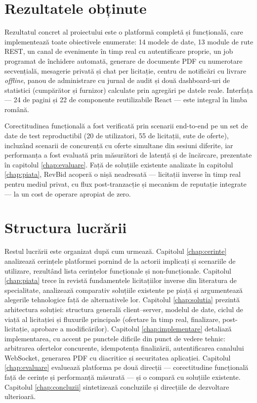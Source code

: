 \section{Rezultatele obținute}

Rezultatul concret al proiectului este o platformă completă și funcțională, care implementează toate obiectivele enumerate: 14 modele de date, 13 module de rute REST, un canal de evenimente în timp real cu autentificare proprie, un job programat de închidere automată, generare de documente PDF cu numerotare secvențială, mesagerie privată și chat per licitație, centru de notificări cu livrare \textit{offline}, panou de administrare cu jurnal de audit și două dashboard-uri de statistici (cumpărător și furnizor) calculate prin agregări pe datele reale. Interfața --- 24 de pagini și 22 de componente reutilizabile React --- este integral în limba română.

Corectitudinea funcțională a fost verificată prin scenarii end-to-end pe un set de date de test reproductibil (20 de utilizatori, 55 de licitații, sute de oferte), incluzând scenarii de concurență cu oferte simultane din sesiuni diferite, iar performanța a fost evaluată prin măsurători de latență și de încărcare, prezentate în capitolul \ref{chap:evaluare}. Față de soluțiile existente analizate în capitolul \ref{chap:piata}, RevBid acoperă o nișă neadresată --- licitații inverse în timp real pentru mediul privat, cu flux post-tranzacție și mecanism de reputație integrate --- la un cost de operare apropiat de zero.

\section{Structura lucrării}

Restul lucrării este organizat după cum urmează. Capitolul \ref{chap:cerinte} analizează cerințele platformei pornind de la actorii implicați și scenariile de utilizare, rezultând lista cerințelor funcționale și non-funcționale. Capitolul \ref{chap:piata} trece în revistă fundamentele licitațiilor inverse din literatura de specialitate, analizează comparativ soluțiile existente pe piață și argumentează alegerile tehnologice față de alternativele lor. Capitolul \ref{chap:solutia} prezintă arhitectura soluției: structura generală client--server, modelul de date, ciclul de viață al licitației și fluxurile principale (ofertare în timp real, finalizare, post-licitație, aprobare a modificărilor). Capitolul \ref{chap:implementare} detaliază implementarea, cu accent pe punctele dificile din punct de vedere tehnic: arbitrarea ofertelor concurente, idempotența finalizării, autentificarea canalului WebSocket, generarea PDF cu diacritice și securitatea aplicației. Capitolul \ref{chap:evaluare} evaluează platforma pe două direcții --- corectitudine funcțională față de cerințe și performanță măsurată --- și o compară cu soluțiile existente. Capitolul \ref{chap:concluzii} sintetizează concluziile și direcțiile de dezvoltare ulterioară.
